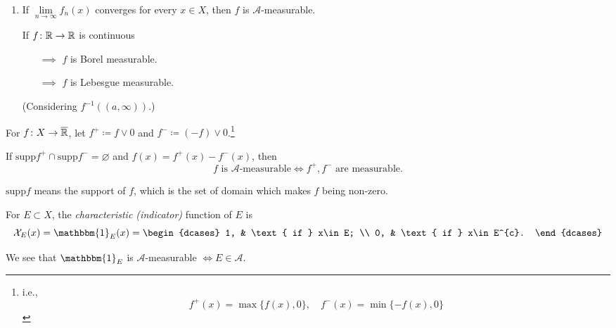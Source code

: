 \begin{property}
\begin{enumerate}
\begin{proof}
			      \par And notice that \(\limsup\limits_{n\to \infty} f_{n} = \inf\limits_{k\in\mathbb{\MakeUppercase{n}}} \sup\limits_{n\geq k} f_{n}\), then the
			      similar argument also proves this case.
		      \end{proof}
		\item If \(\lim\limits_{n \to \infty} f_{n}(x)\) converges for every \(x\in X\), then \(f\) is \(\mathcal{A} \)-measurable.
		      \begin{eg}
			      If \(f\colon \mathbb{\MakeUppercase{r}} \to \mathbb{\MakeUppercase{r}} \) is continuous
			      \begin{itemize}
				      \item[\(\implies\)] \(f\) is Borel measurable.
				      \item[\(\implies\)] \(f\) is Lebesgue measurable.
			      \end{itemize}
			      (Considering \(f^{-1} ((a, \infty ))\).)
		      \end{eg}
	\end{enumerate}
\end{property}

\begin{definition}
	For \(f\colon X\to \overline{\mathbb{\MakeUppercase{r}} }\), let \(f^+ \coloneqq f\vee 0\) and \(f^-\coloneqq (-f)\vee 0\).\footnote{i.e., \[
			f^+(x) = \max\{f(x), 0\},\quad f^-(x) = \min\{-f(x), 0\}
		\]}
\end{definition}
\begin{remark}
	If \(\mathrm{supp} f^+ \cap  \mathrm{supp} f^- = \varnothing \) and \(f(x) = f^+(x) - f^-(x)\), then
	\[
		f\text{ is }\mathcal{A}\text{-measurable} \iff f^+, f^- \text{ are measurable}.
	\]
\end{remark}
\begin{notation}
	\(\mathrm{supp} f\) means the support of \(f\), which is the set of domain which makes \(f\) being non-zero.
\end{notation}

\begin{definition}
	For \(E\subset X\), the \emph{characteristic (indicator)} function of \(E\) is
	\[
		\mathcal{X} _E (x)= \mathbbm{1}_{E}(x) = \begin{dcases}
			1, & \text{ if }  x\in E;     \\
			0, & \text{ if }  x\in E^{c}.
		\end{dcases}
	\]
\end{definition}
\begin{remark}
	We see that \(\mathbbm{1}_{ E}\) is \(\mathcal{A}\)-measurable \(\iff E\in\mathcal{A}\).
\end{remark}

